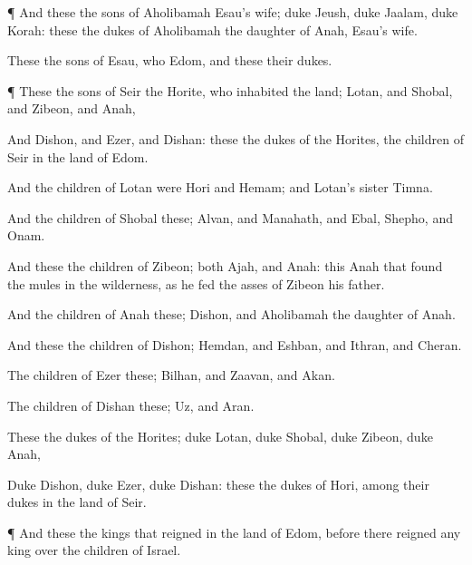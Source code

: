 {\par }{\PP {}¶ And these
{} the
sons of
Aholibamah
Esau’s
wife;
duke
Jeush,
duke
Jaalam,
duke
Korah: these
{} the
dukes
{} of
Aholibamah the
daughter of
Anah,
Esau’s
wife.

These
{} the
sons of
Esau, who
{}
Edom, and these
{} their
dukes.


\par }{\PP {}¶ These
{} the
sons of
Seir the
Horite, who
inhabited the
land;
Lotan, and
Shobal, and
Zibeon, and
Anah,

And
Dishon, and
Ezer, and
Dishan: these
{} the
dukes of the
Horites, the
children of
Seir in the
land of
Edom.

And the
children of
Lotan were
Hori and
Hemam; and
Lotan’s
sister
{}
Timna.

And the
children of
Shobal
{} these;
Alvan, and
Manahath, and
Ebal,
Shepho, and
Onam.

And these
{} the
children of
Zibeon; both
Ajah, and
Anah: this
{}
Anah that
found the
mules in the
wilderness, as he
fed the
asses of
Zibeon his
father.

And the
children of
Anah
{} these;
Dishon, and
Aholibamah the
daughter of
Anah.

And these
{} the
children of
Dishon;
Hemdan, and
Eshban, and
Ithran, and
Cheran.

The
children of
Ezer
{} these;
Bilhan, and
Zaavan, and
Akan.

The
children of
Dishan
{} these;
Uz, and
Aran.

These
{} the
dukes
{} of the
Horites;
duke
Lotan,
duke
Shobal,
duke
Zibeon,
duke
Anah,

Duke
Dishon,
duke
Ezer,
duke
Dishan: these
{} the
dukes
{} of
Hori, among their
dukes in the
land of
Seir.


\par }{\PP {}¶ And these
{} the
kings that
reigned in the
land of
Edom,
before there
reigned any
king over the
children of
Israel.

}

